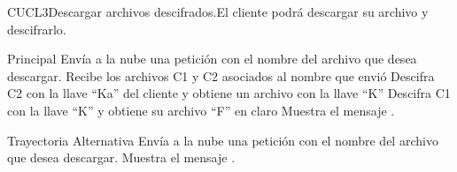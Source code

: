 
\begin{UseCase}{CUCL3}{Descargar archivos descifrados.}{El cliente podrá descargar su archivo y descifrarlo.}

\end{UseCase}


\begin{UCtrayectoria}{Principal}
\UCpaso [\UCactor] Envía a la nube una petición con el nombre del archivo que desea descargar.
\UCpaso Recibe los archivos C1 y C2 asociados al nombre que envió
\UCpaso Descifra C2 con la llave “Ka” del cliente y obtiene un archivo con la llave “K”
\UCpaso Descifra C1 con la llave “K” y obtiene su archivo “F” en claro
\UCpaso Muestra el mensaje .\end{UCtrayectoria}

\begin{UCtrayectoria}{Trayectoria Alternativa}
\UCpaso [\UCactor] Envía a la nube una petición con el nombre del archivo que desea descargar.
\UCpaso Muestra el mensaje .\end{UCtrayectoria}


